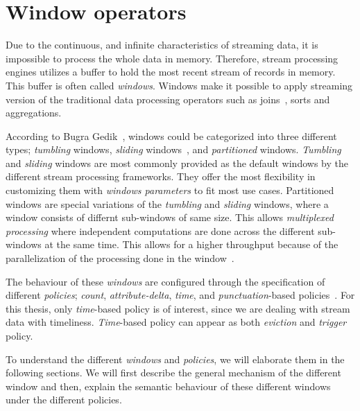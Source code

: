 \chapter{Window operators}
\label{chap:window_operators}

Due to the continuous, and infinite characteristics of streaming data, 
it is impossible to process the whole data in memory. Therefore, 
stream processing engines utilizes a buffer to hold the most recent stream of 
records in memory. This buffer is often called \emph{windows}. Windows make it 
possible to apply streaming version of the traditional data processing operators such
as joins~\cite{grubjoin}, sorts and aggregations. 

According to Bugra Gedik~\cite{generic_window_sem}, windows could be categorized into 
three different types; \emph{tumbling} windows, 
\emph{sliding} windows~\cite{stream_standford,spade_stream}, and \emph{partitioned} windows. 
\emph{Tumbling} and \emph{sliding} windows are most commonly provided as 
the default windows by the different stream processing frameworks. 
They offer the most flexibility in customizing them with \emph{windows parameters} to fit 
most use cases. Partitioned windows are special variations of the \emph{tumbling} and \emph{sliding}
windows, where a window consists of differnt sub-windows of same size. This allows 
\emph{multiplexed processing} where independent computations are done across the 
different sub-windows at the same time. This allows for a higher throughput because of 
the parallelization of the processing done in the window~\cite{generic_window_sem}.

The behaviour of these \emph{windows} are configured through the specification of different 
\emph{policies}; \emph{count}, \emph{attribute-delta}, \emph{time}, and
\emph{punctuation}-based policies~\cite{generic_window_sem}. For this thesis, only 
\emph{time}-based policy is of interest, since we are dealing with stream data with 
timeliness. \emph{Time}-based policy can appear as both \emph{eviction} and \emph{trigger} 
policy. 

To understand the different \emph{windows} and \emph{policies}, we will elaborate them 
in the following sections. We will first describe the general mechanism of the 
different window and then, explain the semantic behaviour of these different 
windows under the different policies.  





